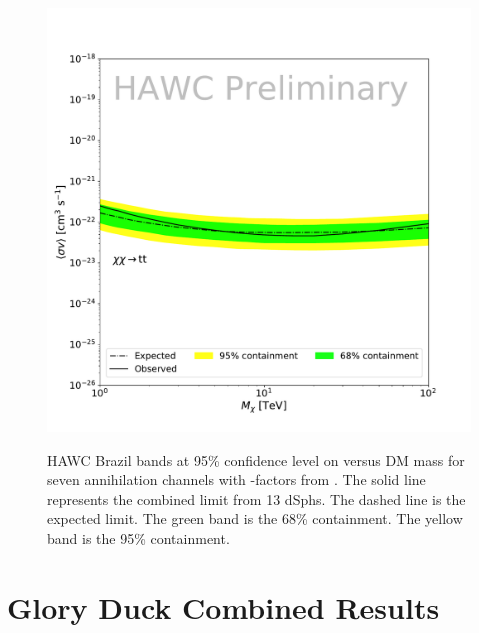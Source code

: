 \begin{figure}[ht]
{    \includegraphics[scale=0.21]{figures/glory_duck/hawc/GD_BrazilBand_tt.pdf}
    }
    \caption{HAWC Brazil bands at 95\% confidence level on \sv versus DM mass for seven annihilation channels with \J-factors from \GS \cite{Geringer-Sameth:2014yza}. The solid line represents the combined limit from 13 dSphs. The dashed line is the expected limit. The green band is the 68\% containment. The yellow band is the 95\% containment.}
\label{fig:hawc_brazil_band}
\end{figure}

\section{Glory Duck Combined Results}\label{sec:results}

